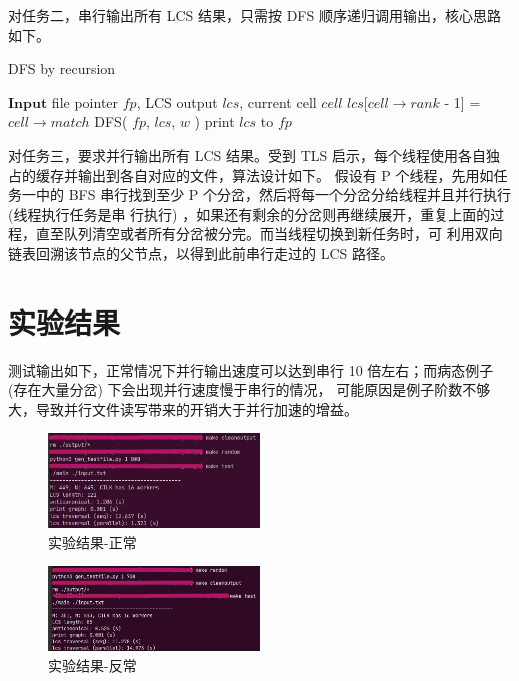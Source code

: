 \documentclass[11pt]{article}
\begin{document}
对任务二，串行输出所有 LCS 结果，只需按 DFS 顺序递归调用输出，核心思路如下。

\begin{algorithm}[H]
	\caption{DFS by recursion}
	\begin{algorithmic}
		\State $\textbf{Input}$ file pointer $fp$, LCS output $lcs$, current cell $cell$
		\State $lcs$[$cell\rightarrow rank$ - 1] = $cell\rightarrow match$
		\EndIf
		\State DFS( $fp$, $lcs$, $w$ )
		\EndFor
		\Else
		\State print $lcs$ to $fp$
		\EndIf
	\end{algorithmic}
\end{algorithm}

对任务三，要求并行输出所有 LCS 结果。受到 TLS 启示，每个线程使用各自独占的缓存并输出到各自对应的文件，算法设计如下。
假设有 P 个线程，先用如任务一中的 BFS 串行找到至少 P 个分岔，然后将每一个分岔分给线程并且并行执行 (线程执行任务是串
行执行) ，如果还有剩余的分岔则再继续展开，重复上面的过程，直至队列清空或者所有分岔被分完。而当线程切换到新任务时，可
利用双向链表回溯该节点的父节点，以得到此前串行走过的 LCS 路径。


\section{实验结果}

测试输出如下，正常情况下并行输出速度可以达到串行 10 倍左右；而病态例子 (存在大量分岔) 下会出现并行速度慢于串行的情况，
可能原因是例子阶数不够大，导致并行文件读写带来的开销大于并行加速的增益。

\begin{figure}[H]
	\centering
	\includegraphics[width=0.5\textwidth]{./img/output-1.jpg}
	\caption{实验结果-正常}
\end{figure}

\begin{figure}[H]
	\centering
	\includegraphics[width=0.5\textwidth]{./img/output-2.jpg}
	\caption{实验结果-反常}
\end{figure}
\end{document}
